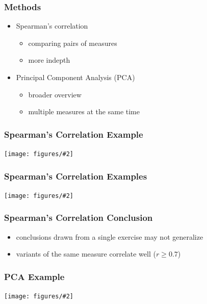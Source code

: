 \documentclass[bigger]{beamer}
\newcommand{\img}[2]{
  \begin{center}
    \texttt{[image: figures/\#2]}
  \end{center}
}
\begin{document}
\begin{frame}
\frametitle{Methods}
\begin{itemize}
    \item Spearman's correlation
    \begin{itemize}
        \item comparing pairs of measures
        \item more indepth
    \end{itemize}
    \item Principal Component Analysis (PCA)
    \begin{itemize}
        \item broader overview
        \item multiple measures at the same time
    \end{itemize}
\end{itemize}

\end{frame}


\begin{frame}
\frametitle{Spearman's Correlation Example}
\img{.6}{correlation-robomission}
\end{frame}

\begin{frame}
\frametitle{Spearman's Correlation Examples}
\img{1}{correlations}
\end{frame}

\begin{frame}
\frametitle{Spearman's Correlation Conclusion}
\begin{itemize}
    \item conclusions drawn from a single exercise may not generalize
    \item variants of the same measure correlate well ($r \ge 0.7$)
\end{itemize}
\end{frame}

\begin{frame}
\frametitle{PCA Example}
\img{.6}{pca-robomission}
\end{frame}
\end{document}
